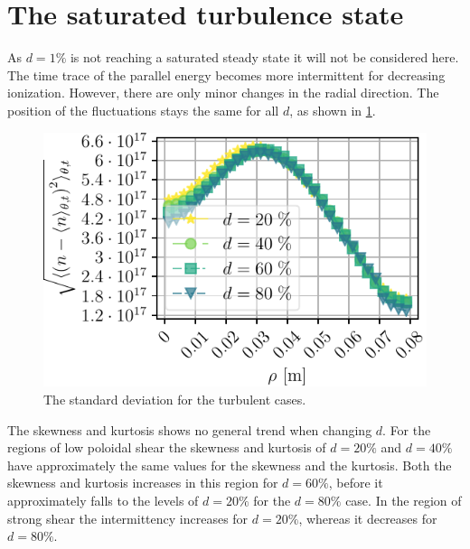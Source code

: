 \section{The saturated turbulence state}
%
As $d=1\%$ is not reaching a saturated steady state it will not be considered here.
The time trace of the parallel energy becomes more intermittent for decreasing ionization.
However, there are only minor changes in the radial direction.
The position of the fluctuations stays the same for all $d$, as shown in \cref{fig:nnScanPosOfFluct}.
%
\begin{figure}[htb]
    \centering
    \includegraphics{fig/results/neutral/nnScanPosOfFluct}
    \caption{The standard deviation for the turbulent cases.}
    \label{fig:nnScanPosOfFluct}
\end{figure}
%
The skewness and kurtosis shows no general trend when changing $d$.
For the regions of low poloidal shear the skewness and kurtosis of $d=20\%$ and $d=40\%$ have approximately the same values for the skewness and the kurtosis.
Both the skewness and kurtosis increases in this region for $d=60\%$, before it approximately falls to the levels of $d=20\%$ for the $d=80\%$ case.
In the region of strong shear the intermittency increases for $d=20\%$, whereas it decreases for $d=80\%$.
%
